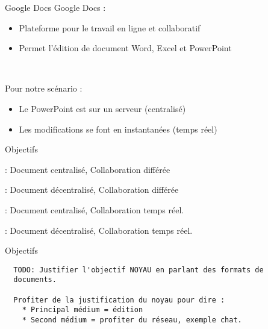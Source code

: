 \begin{frame}{Google Docs}
  Google Docs :
  \begin{itemize}
    \item Plateforme pour le travail en ligne et collaboratif
    \item Permet l'édition de document Word, Excel et PowerPoint
  \end{itemize}~

  Pour notre scénario :
  \begin{itemize}
    \item Le PowerPoint est sur un serveur (centralisé)
    \item Les modifications se font en instantanées (temps réel)
  \end{itemize}
\end{frame}

\begin{frame}{Objectifs}
  \begin{description}
    \item[Svn] : Document centralisé, Collaboration différée 
    \item[Git] : Document décentralisé, Collaboration différée
    \item [Google Docs] : Document centralisé, Collaboration temps réel.
    \item<2-> [CEK-P2P] : Document décentralisé, Collaboration temps réel.
  \end{description}
\end{frame}

\begin{frame}[containsverbatim]{Objectifs}
\begin{verbatim}
  TODO: Justifier l'objectif NOYAU en parlant des formats de
  documents.
  
  Profiter de la justification du noyau pour dire :
    * Principal médium = édition
    * Second médium = profiter du réseau, exemple chat.
\end{verbatim}
\end{frame}

